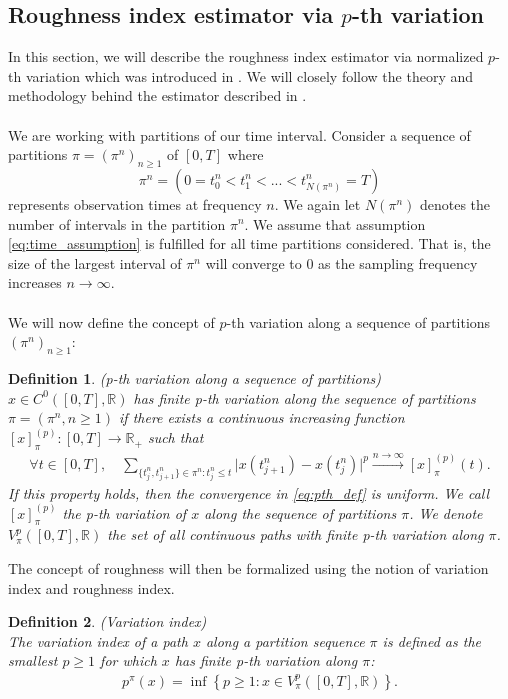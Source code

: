 \documentclass{article}
\newtheorem{definition}{Definition}
\begin{document}
\subsection{Roughness index estimator via $p$-th variation} \label{sec:roughest_pth}
In this section, we will describe the roughness index estimator via normalized $p$-th variation which was introduced in \cite{cont}. We will closely follow the theory and methodology behind the estimator described in \cite{cont}.\\\\
We are working with partitions of our time interval. Consider a sequence of partitions $\pi = (\pi^n) _{n\geq 1}$ of $[0,T]$ where
\[
\pi^n = \left( 0 = t_0^n < t_1^n < ... < t^n_{N(\pi^n)}=T \right)
\]
represents observation times at frequency $n$. We again let $N(\pi^n)$ denotes the number of intervals in the partition $\pi^n$. We assume that assumption \eqref{eq:time_assumption} is fulfilled for all time partitions considered. That is, the size of the largest interval of $\pi^n$ will converge to 0 as the sampling frequency increases $n\rightarrow \infty$.\\\\
We will now define the concept of $p$-th variation along a sequence of partitions $(\pi^n) _{n\geq 1}$:
\begin{definition}
\textnormal{(p-th variation along a sequence of partitions)}\\
$x \in C^0([0,T], \mathbb{R})$ has finite p-th variation along the sequence of partitions 
$\pi = (\pi^n, n \geq 1)$ if there exists a continuous increasing function $[x]_{\pi}^{(p)}: [0,T] \to \mathbb{R}_+$ such that
\begin{align}
\forall t \in [0,T], \quad \sum_{\{t_j^n, t_{j+1}^n\} \in \pi^n: t_j^n \leq t} \lvert x(t_{j+1}^n) - x(t_j^n) \rvert^p 
{\overset{n \to \infty}\longrightarrow} [x]_{\pi}^{(p)}(t). \label{eq:pth_def}
\end{align}
If this property holds, then the convergence in \eqref{eq:pth_def} is uniform. We call $[x]_{\pi}^{(p)}$ the p-th variation of $x$ along the sequence of partitions $\pi$. We denote $V_\pi^p([0,T], \mathbb{R})$ the set of all continuous paths with finite p-th variation along $\pi$.
\label{def:pth_var}
\end{definition}
The concept of roughness will then be formalized using the notion of variation index and roughness index.
\begin{definition}
\textnormal{(Variation index)}\\
The variation index of a path $x$ along a partition sequence $\pi$ is defined as the smallest $p \geq 1$ for which $x$ has finite p-th variation along $\pi$:
\begin{align*}
p^{\pi}(x) = \inf \left\{ p \geq 1 : x \in V_{\pi}^p([0,T], \mathbb{R}) \right\}.
\end{align*}
\label{def:var_index}
\end{definition}
\end{document}
